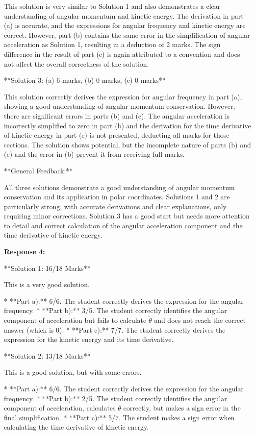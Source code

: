 \documentclass[a4paper,11pt]{article}
\begin{document}
This solution is very similar to Solution 1 and also demonstrates a clear understanding of angular momentum and kinetic energy. The derivation in part (a) is accurate, and the expressions for angular frequency and kinetic energy are correct. However, part (b) contains the same error in the simplification of angular acceleration as Solution 1, resulting in a deduction of 2 marks. The sign difference in the result of part (c) is again attributed to a convention and does not affect the overall correctness of the solution.

**Solution 3: (a) 6 marks, (b) 0 marks, (c) 0 marks**

This solution correctly derives the expression for angular frequency in part (a), showing a good understanding of angular momentum conservation. However, there are significant errors in parts (b) and (c). The angular acceleration is incorrectly simplified to zero in part (b) and the derivation for the time derivative of kinetic energy in part (c) is not presented, deducting all marks for those sections. The solution shows potential, but the incomplete nature of parts (b) and (c) and the error in (b) prevent it from receiving full marks.

**General Feedback:**

All three solutions demonstrate a good understanding of angular momentum conservation and its application in polar coordinates. Solutions 1 and 2 are particularly strong, with accurate derivations and clear explanations, only requiring minor corrections. Solution 3 has a good start but needs more attention to detail and correct calculation of the angular acceleration component and the time derivative of kinetic energy.

\textbf{Response 4:}

**Solution 1: 16/18 Marks**

This is a very good solution.

*   **Part a):** 6/6. The student correctly derives the expression for the angular frequency.
*   **Part b):** 3/5. The student correctly identifies the angular component of acceleration but fails to calculate \(\ddot{\theta}\) and does not reach the correct answer (which is 0). 
*   **Part c):** 7/7. The student correctly derives the expression for the kinetic energy and its time derivative.

**Solution 2: 13/18 Marks**

This is a good solution, but with some errors.

*   **Part a):** 6/6. The student correctly derives the expression for the angular frequency.
*   **Part b):** 2/5. The student correctly identifies the angular component of acceleration, calculates \(\ddot{\theta}\) correctly, but makes a sign error in the final simplification.
*   **Part c):** 5/7. The student makes a sign error when calculating the time derivative of kinetic energy.
\end{document}

